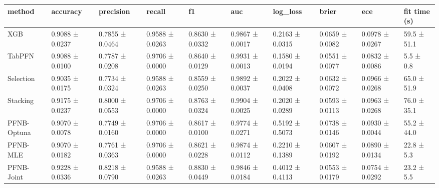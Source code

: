 \begin{tabular}{llllllllll}
\toprule
method & accuracy & precision & recall & f1 & auc & log\_loss & brier & ece & fit time (s) \\
\midrule
XGB & 0.9088 ± 0.0237 & 0.7855 ± 0.0464 & 0.9588 ± 0.0263 & 0.8630 ± 0.0332 & 0.9867 ± 0.0017 & 0.2163 ± 0.0315 & 0.0659 ± 0.0082 & 0.0978 ± 0.0267 & 59.5 ± 51.1 \\
TabPFN & 0.9088 ± 0.0100 & 0.7787 ± 0.0208 & 0.9706 ± 0.0000 & 0.8640 ± 0.0129 & 0.9931 ± 0.0013 & 0.1580 ± 0.0194 & 0.0551 ± 0.0077 & 0.0832 ± 0.0086 & 5.5 ± 0.8 \\
Selection & 0.9035 ± 0.0175 & 0.7734 ± 0.0324 & 0.9588 ± 0.0263 & 0.8559 ± 0.0250 & 0.9892 ± 0.0037 & 0.2022 ± 0.0408 & 0.0632 ± 0.0072 & 0.0966 ± 0.0268 & 65.0 ± 51.9 \\
Stacking & 0.9175 ± 0.0237 & 0.8000 ± 0.0553 & 0.9706 ± 0.0000 & 0.8763 ± 0.0324 & 0.9904 ± 0.0025 & 0.2020 ± 0.0289 & 0.0593 ± 0.0113 & 0.0963 ± 0.0268 & 76.0 ± 35.1 \\
PFNB-Optuna & 0.9070 ± 0.0078 & 0.7749 ± 0.0160 & 0.9706 ± 0.0000 & 0.8617 ± 0.0100 & 0.9774 ± 0.0271 & 0.5192 ± 0.5073 & 0.0738 ± 0.0146 & 0.0930 ± 0.0044 & 55.2 ± 44.0 \\
PFNB-MLE & 0.9070 ± 0.0182 & 0.7761 ± 0.0363 & 0.9706 ± 0.0000 & 0.8621 ± 0.0228 & 0.9874 ± 0.0112 & 0.2210 ± 0.1389 & 0.0607 ± 0.0192 & 0.0890 ± 0.0134 & 22.8 ± 5.3 \\
PFNB-Joint & 0.9228 ± 0.0336 & 0.8218 ± 0.0790 & 0.9588 ± 0.0263 & 0.8830 ± 0.0449 & 0.9846 ± 0.0184 & 0.4012 ± 0.4113 & 0.0553 ± 0.0179 & 0.0754 ± 0.0292 & 23.2 ± 5.5 \\
\bottomrule
\end{tabular}
